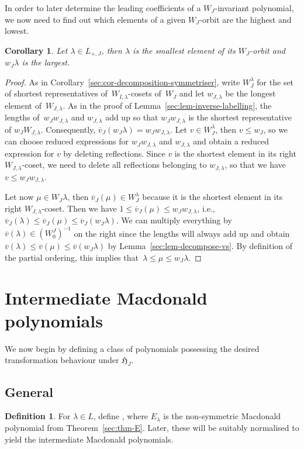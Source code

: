 \documentclass[pdftex]{sigma}
\newtheorem{Corollary}[Theorem]{Corollary}
\theoremstyle{definition}
\newtheorem{Definition}[Theorem]{Definition}
\numberwithin{equation}{section}
\begin{document}
In order to later determine the leading coefficients of a $W_J$-invariant
polynomial, we now need to find out
which elements of a given $W_J$-orbit are the highest and lowest.
\begin{Corollary}
 Let $\lambda\in L_{+,J}$, then $\lambda$ is the smallest element of its $W_J$-orbit and
 $w_J\lambda$ is the largest.
\end{Corollary}
\begin{proof}
 As in Corollary~\ref{sec:cor-decomposition-symmetriser}, write
 $W_J^\lambda$ for the set of shortest representatives
 of~$W_{I,\lambda}$-cosets of~$W_J$ and let $w_{J,\lambda}$ be the longest element of~$W_{J,\lambda}$. As in the proof of Lemma~\ref{sec:lem-inverse-labelling}, the lengths of~$w_Jw_{J,\lambda}$ and
 $w_{J,\lambda}$ add up so that $w_Jw_{J,\lambda}$ is the shortest representative of $w_JW_{J,\lambda}$. Consequently, $\overline{v}_J(w_J\lambda) = w_Jw_{J,\lambda}$. Let
 $v\in W_J^\lambda$, then $v\le w_J$, so we can choose reduced expressions for $w_Jw_{J,\lambda}$ and $w_{J,\lambda}$ and
 obtain a reduced expression for $v$ by deleting reflections. Since $v$ is the shortest element in its
 right $W_{J,\lambda}$-coset, we need to delete all reflections belonging to $w_{J,\lambda}$, so that
 we have $v\le w_J w_{J,\lambda}$.

 Let now $\mu\in W_J\lambda$, then $\overline{v}_J(\mu)\in W_J^\lambda$ because it is the shortest element in its
 right $W_{J,\lambda}$-coset. Then we have $1\le \overline{v}_J(\mu)\le w_Jw_{J,\lambda}$, i.e.,
$
 \overline{v}_J(\lambda)\le \overline{v}_J(\mu) \le \overline{v}_J(w_J\lambda)$.
 We can multiply everything by $\overline{v}(\lambda)\in (W_0^J)^{-1}$ on the right since the lengths will always add up and
 obtain~${
 \overline{v}(\lambda)\le\overline{v}(\mu)\le\overline{v}(w_J\lambda)}
$
 by Lemma~\ref{sec:lem-decompose-vs}. By definition of the partial ordering, this implies that~${\lambda\le\mu\le w_J\lambda}$.
\end{proof}

\section{Intermediate Macdonald polynomials}\label{sec:poly}
We now begin by defining a class of polynomials possessing the desired
transformation behaviour under $\mathfrak{H}_J$.

\subsection{General}
\begin{Definition}
 For $\lambda\in L$, define , where $E_\lambda$ is the non-symmetric Macdonald polynomial from
 Theorem~\ref{sec:thm-E}.
 Later, these will be suitably normalised to yield the intermediate Macdonald polynomials.
\end{Definition}
\end{document}
